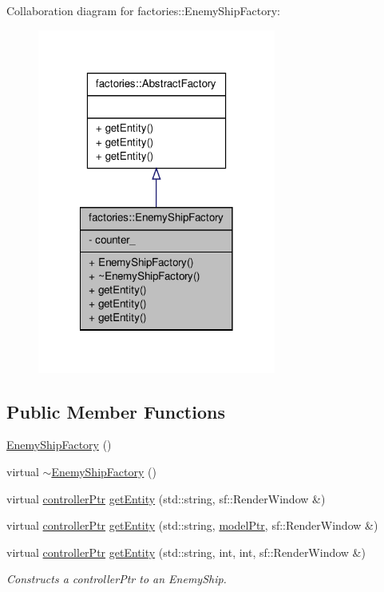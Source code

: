 \-Collaboration diagram for factories\-:\-:\-Enemy\-Ship\-Factory\-:
\nopagebreak
\begin{figure}[H]
\begin{center}
\leavevmode
\includegraphics[width=222pt]{da/d24/classfactories_1_1EnemyShipFactory__coll__graph}
\end{center}
\end{figure}
\subsection*{\-Public \-Member \-Functions}
\begin{DoxyCompactItemize}
\item 
\hyperlink{classfactories_1_1EnemyShipFactory_a8a3299b6fb5a7086ed0a51f201e63212}{\-Enemy\-Ship\-Factory} ()
\item 
virtual \hyperlink{classfactories_1_1EnemyShipFactory_a3fd2b9229516a6fca99d0e7a63436c7a}{$\sim$\-Enemy\-Ship\-Factory} ()
\item 
virtual \hyperlink{Game_8h_a21b04f6cf2d5990b82725fac5ea2ce9a}{controller\-Ptr} \hyperlink{classfactories_1_1EnemyShipFactory_a5b7044ae923235d2cb1940b06ebd22cb}{get\-Entity} (std\-::string, sf\-::\-Render\-Window \&)
\item 
virtual \hyperlink{Game_8h_a21b04f6cf2d5990b82725fac5ea2ce9a}{controller\-Ptr} \hyperlink{classfactories_1_1EnemyShipFactory_a405f286b52252db71b1eddbfde7da672}{get\-Entity} (std\-::string, \hyperlink{ModelView_8h_a78966ddb517fca8d2b29a2bc5c31e74e}{model\-Ptr}, sf\-::\-Render\-Window \&)
\item 
virtual \hyperlink{Game_8h_a21b04f6cf2d5990b82725fac5ea2ce9a}{controller\-Ptr} \hyperlink{classfactories_1_1EnemyShipFactory_acb4c098348b33aa774696952171b2c7b}{get\-Entity} (std\-::string, int, int, sf\-::\-Render\-Window \&)
\begin{DoxyCompactList}\small\item\em \-Constructs a controller\-Ptr to an \-Enemy\-Ship. \end{DoxyCompactList}\end{DoxyCompactItemize}
